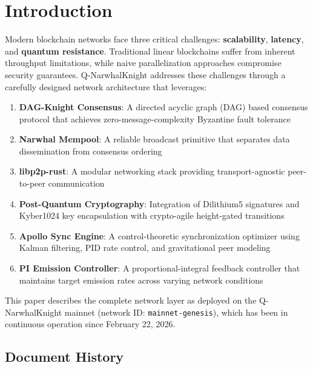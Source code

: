 \documentclass[11pt,a4paper]{article}
\begin{document}
\tableofcontents
\newpage

\section{Introduction}

Modern blockchain networks face three critical challenges: \textbf{scalability}, \textbf{latency}, and \textbf{quantum resistance}. Traditional linear blockchains suffer from inherent throughput limitations, while naive parallelization approaches compromise security guarantees. Q-NarwhalKnight addresses these challenges through a carefully designed network architecture that leverages:

\begin{enumerate}
    \item \textbf{DAG-Knight Consensus}: A directed acyclic graph (DAG) based consensus protocol that achieves zero-message-complexity Byzantine fault tolerance
    \item \textbf{Narwhal Mempool}: A reliable broadcast primitive that separates data dissemination from consensus ordering
    \item \textbf{libp2p-rust}: A modular networking stack providing transport-agnostic peer-to-peer communication
    \item \textbf{Post-Quantum Cryptography}: Integration of Dilithium5 signatures and Kyber1024 key encapsulation with crypto-agile height-gated transitions
    \item \textbf{Apollo Sync Engine}: A control-theoretic synchronization optimizer using Kalman filtering, PID rate control, and gravitational peer modeling
    \item \textbf{PI Emission Controller}: A proportional-integral feedback controller that maintains target emission rates across varying network conditions
\end{enumerate}

This paper describes the complete network layer as deployed on the Q-NarwhalKnight mainnet (network ID: \texttt{mainnet-genesis}), which has been in continuous operation since February 22, 2026.

\subsection{Document History}
\end{document}
